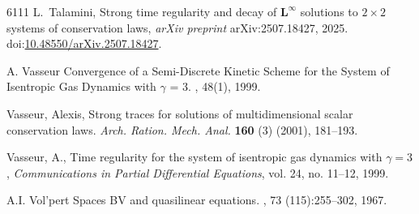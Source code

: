 \documentclass[11pt, twoside, reqno]{amsart}
\theoremstyle{definition}
\theoremstyle{remark}
\numberwithin{equation}{section}
\begin{document}
\begin{thebibliography}{6111}
L.~Talamini,
Strong time regularity and decay of $\mathbf{L}^\infty$ solutions to $2\times2$ systems of conservation laws,
\emph{arXiv preprint} arXiv:2507.18427, 2025.
doi:\href{https://doi.org/10.48550/arXiv.2507.18427}{10.48550/arXiv.2507.18427}.





A. Vasseur
\newblock Convergence of a Semi-Discrete Kinetic Scheme for the System of Isentropic Gas Dynamics with $\gamma$ = 3.
, 48(1), 1999.

 Vasseur, Alexis, 
Strong traces for solutions of multidimensional scalar
              conservation laws.
{\it Arch. Ration. Mech. Anal.} {\bf 160} (3) (2001), 181--193.

Vasseur, A., 
Time regularity for the system of isentropic gas dynamics with \(\gamma = 3\), 
\textit{Communications in Partial Differential Equations}, vol. 24, no. 11–12, 1999.


A.I. Vol'pert
\newblock Spaces BV and quasilinear equations.
, 73 (115):255--302, 1967.





\end{thebibliography}
\end{document}
